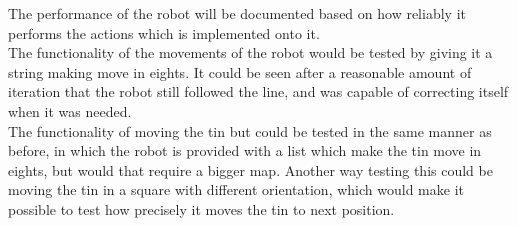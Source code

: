 \documentclass[10pt,a4paper]{article}
\begin{document}
The performance of the robot will be documented based on how reliably it performs the actions which is implemented onto it. \\


	The  functionality of the movements of the robot would be tested by giving it a string making move in eights.   It could be seen after a reasonable amount of iteration that the robot still followed the line, and was capable of correcting itself when   it was needed. \\
	
	The functionality of moving the tin but could be tested in the same manner as before, in which the robot is provided with a list which make the tin move in eights,  but would that require a bigger map. Another way testing this could be moving the tin in a square with different orientation, which would make it possible to test how precisely it moves the tin to next position. \\
	
	
	

	
	
\end{document}

